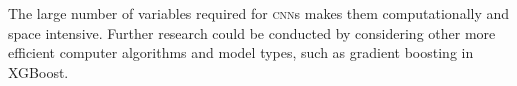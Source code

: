 The large number of variables required for \textsc{cnn}s makes them computationally and space intensive. Further research could be conducted by considering other more efficient computer algorithms and model types, such as gradient boosting in XGBoost.

 

%